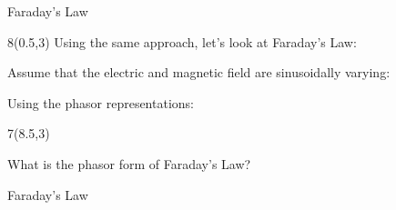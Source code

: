 \begin{frame}{Faraday's Law}
\begin{textblock}{8}(0.5,3)
\; Using the same approach, let's look at Faraday's Law:
\begin{small}
\end{small}
\; Assume that the electric and magnetic field are sinusoidally varying:

\vspace{-8pt}

\; Using the phasor representations: 

\vspace{-18pt}

\begin{small}
\end{small}
\end{textblock}
\begin{textblock}{7}(8.5,3)
\begin{small}
\; What is the phasor form of Faraday's Law?
\end{small}
\vspace{-18pt}
\begin{myblock}[0.9]{Faraday's Law}
\end{myblock}
\end{textblock}
\end{frame}

